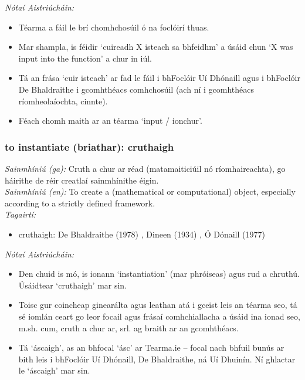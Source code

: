  \noindent \textit{Nótaí Aistriúcháin:}
\begin{itemize}
	\item Téarma a fáil le brí chomhchosúil ó na foclóirí thuas.
	\item Mar shampla, is féidir `cuireadh X isteach sa bhfeidhm' a úsáid chun `X was input into the function' a chur in iúl.
	\item Tá an frása `cuir isteach' ar fad le fáil i bhFoclóir Uí Dhónaill agus i bhFoclóir De Bhaldraithe i gcomhthéacs comhchosúil (ach ní i gcomhthéacs ríomheolaíochta, cinnte).
	\item Féach chomh maith ar an téarma `input / ionchur'.
\end{itemize}


\subsubsection*{to instantiate (briathar): cruthaigh}
 \noindent \textit{Sainmhíniú (ga):} Cruth a chur ar réad (matamaiticiúil nó ríomhaireachta), go háirithe de réir creatlaí sainmhínithe éigin.
\\
 \noindent \textit{Sainmhíniú (en):} To create a (mathematical or computational) object, especially according to a strictly defined framework.
\\
 \noindent \textit{Tagairtí:}
\begin{itemize}
	\item cruthaigh: De Bhaldraithe (1978) \cite{de-bhaldraithe}, Dineen (1934) \cite{dineen}, Ó Dónaill (1977) \cite{odonaill}
\end{itemize}

 \noindent \textit{Nótaí Aistriúcháin:}
\begin{itemize}
	\item Den chuid is mó, is ionann `instantiation' (mar phróiseas) agus rud a chruthú. Úsáidtear `cruthaigh' mar sin.
	\item Toisc gur coincheap ginearálta agus leathan atá i gceist leis an téarma seo, tá sé iomlán ceart go leor focail agus frásaí comhchiallacha a úsáid ina ionad seo, m.sh. cum, cruth a chur ar, srl. ag braith ar an gcomhthéacs.
	\item Tá `áscaigh', as an  bhfocal `ásc' ar Tearma.ie -- focal nach bhfuil bunús ar bith leis i bhFoclóir Uí Dhónaill, De Bhaldraithe, ná Uí Dhuinín. Ní ghlactar le `áscaigh' mar sin.
\end{itemize}


